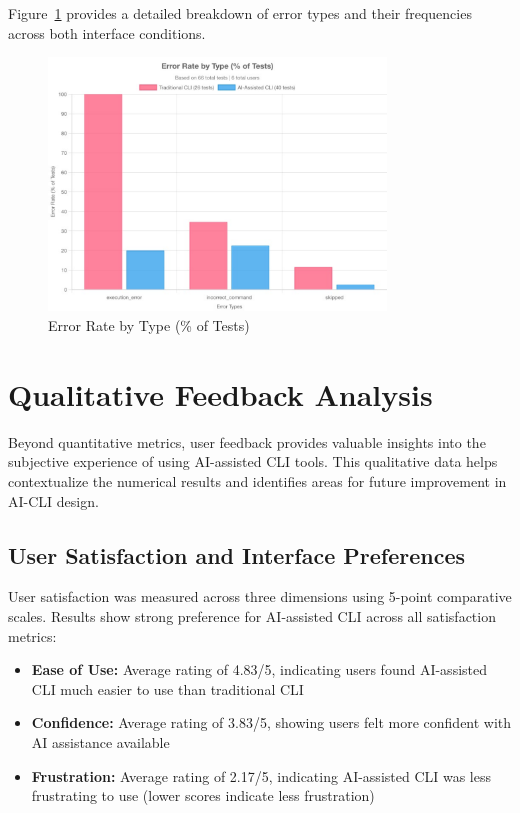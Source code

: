 Figure~\ref{fig:error_analysis} provides a detailed breakdown of error types and their frequencies across both interface conditions.

\begin{figure}[h]
	\centering
	\includegraphics[width=0.8\textwidth]{assets/figures/error_analysis.pdf}
	\caption{Error Rate by Type (\% of Tests)}
	\label{fig:error_analysis}
\end{figure}

\section{Qualitative Feedback Analysis}

Beyond quantitative metrics, user feedback provides valuable insights into the subjective experience of using AI-assisted CLI tools. This qualitative data helps contextualize the numerical results and identifies areas for future improvement in AI-CLI design.

\subsection{User Satisfaction and Interface Preferences}

User satisfaction was measured across three dimensions using 5-point comparative scales. Results show strong preference for AI-assisted CLI across all satisfaction metrics:

\begin{itemize}
	\item \textbf{Ease of Use:} Average rating of 4.83/5, indicating users found AI-assisted CLI much easier to use than traditional CLI
	\item \textbf{Confidence:} Average rating of 3.83/5, showing users felt more confident with AI assistance available
	\item \textbf{Frustration:} Average rating of 2.17/5, indicating AI-assisted CLI was less frustrating to use (lower scores indicate less frustration)
\end{itemize}

